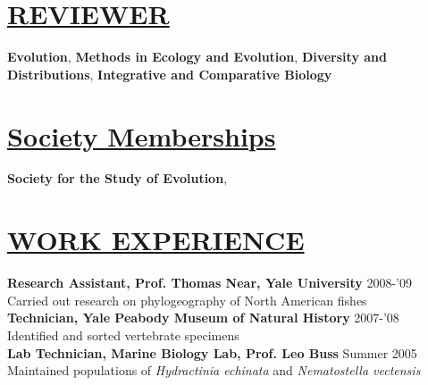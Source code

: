 \documentclass{res}
\begin{document}
\begin{resume}
\section{\underline{REVIEWER}}
\textbf{Evolution}, 
\textbf{Methods in Ecology and Evolution}, 
\textbf{Diversity and Distributions},
\textbf{Integrative and Comparative Biology}

\section{\underline{Society Memberships}}
\textbf{Society for the Study of Evolution},

\section{\underline{WORK EXPERIENCE}}
\textbf{Research Assistant, Prof. Thomas Near, Yale University} 2008-'09 \\ \vspace{0.3mm}	%
\hspace{4.5mm}Carried out research on phylogeography of North American fishes\\
\textbf{Technician, Yale Peabody Museum of Natural History} 2007-'08 \\ \vspace{0.3mm}	%
\hspace{4.5mm}Identified and sorted vertebrate specimens\\ 
\textbf{Lab Technician, Marine Biology Lab, Prof. Leo Buss} Summer 2005 \\ \vspace{0.3mm}	%
\hspace{4.5mm}Maintained populations of \textit{Hydractinia echinata} and \textit{Nematostella vectensis} 


\end{resume}
\end{document}
